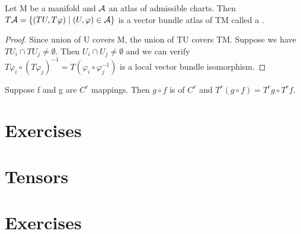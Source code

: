 \begin{thm}
Let M be a manifold and $\mathcal{A}$ an atlas of admissible charts. Then $T\mathcal{A}=\lbrace(TU,T\varphi)\mid(U,\varphi)\in \mathcal{A}\rbrace$ is 
a vector bundle atlas of TM called a . 
\end{thm}
\begin{proof}
Since union of U covers M, the union of TU covers TM. Suppose we have $TU_i\cap TU_j\neq\emptyset$. Then $U_i\cap U_j\neq\emptyset$ and
we can verify $T\varphi_i\circ(T\varphi_j)^{-1}=T(\varphi_i\circ \varphi_j^{-1})$ is a local vector bundle isomorphism.
\end{proof}
\begin{thm}
Suppose f and g are $C^{r}$ mappings. Then $g\circ f$ is of $C^r$ and $T^r(g\circ f)=T^rg\circ T^rf$.
\end{thm}
\section*{Exercises}
\section{Tensors}
\section*{Exercises}